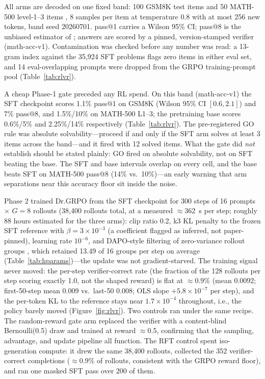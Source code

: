All arms are decoded on one fixed band: 100 GSM8K test items \citep{cobbe2021training} and 50
MATH-500 level-1--3 items \citep{hendrycks2021measuring}, 8 samples per item at temperature
0.8 with at most 256 new tokens, band seed 20260701. pass@1 carries a Wilson 95\% CI; pass@8
is the unbiased estimator of \citet{chen2021evaluating}; answers are scored by a pinned,
version-stamped verifier (math-acc-v1). Contamination was checked before any number was read:
a 13-gram index against the 35{,}924 SFT problems flags zero items in either eval set, and 14
eval-overlapping prompts were dropped from the GRPO training-prompt pool
(Table~\ref{tab:rlvr}).

A cheap Phase-1 gate preceded any RL spend. On this band (math-acc-v1) the SFT checkpoint
scores 1.1\% pass@1 on GSM8K (Wilson 95\% CI $[0.6, 2.1]$) and 7\% pass@8, and 1.5\%/10\% on
MATH-500 L1--3; the pretraining base scores 0.6\%/5\% and 2.25\%/14\% respectively
(Table~\ref{tab:rlvr}). The pre-registered GO rule was absolute solvability---proceed if and
only if the SFT arm solves at least 3 items across the band---and it fired with 12 solved
items. What the gate did \emph{not} establish should be stated plainly: GO fired on absolute
solvability, not on SFT beating the base. The SFT and base intervals overlap on every cell,
and the base beats SFT on MATH-500 pass@8 (14\% vs.\ 10\%)---an early warning that arm
separations near this accuracy floor sit inside the noise.

Phase 2 trained Dr.GRPO \citep{liu2025understanding} from the SFT checkpoint for 300 steps of
16 prompts $\times$ $G{=}8$ rollouts (38{,}400 rollouts total, at a measured $\approx$362~s
per step; roughly 88 hours estimated for the three arms): clip ratio 0.2, k3 KL penalty to the
frozen SFT reference with $\beta = 3\times10^{-3}$ (a coefficient flagged as inferred, not
paper-pinned), learning rate $10^{-6}$, and DAPO-style filtering of zero-variance rollout
groups \citep{yu2025dapo}, which retained 13.49 of 16 groups per step on average
(Table~\ref{tab:hparams})---the update was not gradient-starved. The training signal never
moved: the per-step verifier-correct rate (the fraction of the 128 rollouts per step scoring
exactly 1.0, not the shaped reward) is flat at $\approx$0.9\% (mean 0.0092; first-50-step
mean 0.009 vs.\ last-50 0.008; OLS slope $+5.8\times10^{-7}$ per step), and the per-token KL
to the reference stays near $1.7\times10^{-4}$ throughout, i.e., the policy barely moved
(Figure~\ref{fig:rlvr}). Two controls ran under the same recipe. The random-reward gate arm
\citep{shao2025spurious} replaced the verifier with a content-blind Bernoulli(0.5) draw and
trained at reward $\approx$0.5, confirming that the sampling, advantage, and update pipeline
all function. The RFT control spent iso-generation compute: it drew the same 38{,}400
rollouts, collected the 352 verifier-correct completions ($\approx$0.9\% of rollouts,
consistent with the GRPO reward floor), and ran one masked SFT pass over 200 of them.

